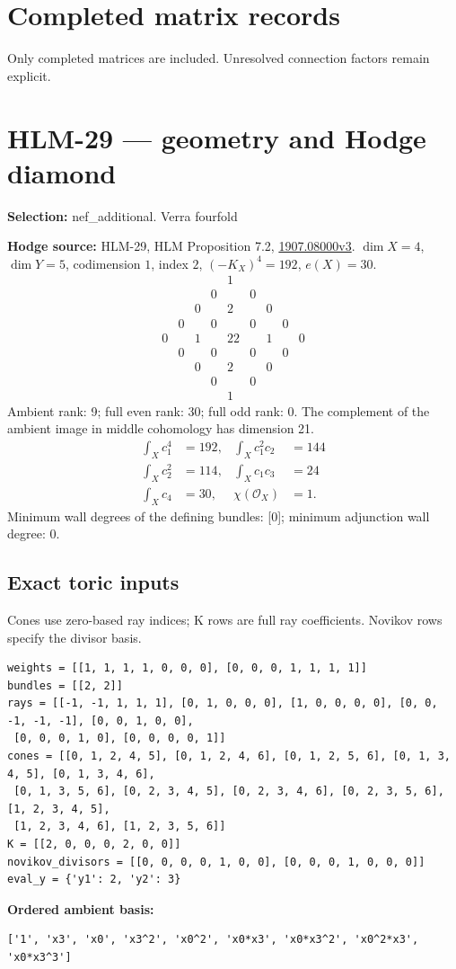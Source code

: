 \documentclass[10pt,a4paper]{article}
\newcommand{\hodge}[4]{\begin{array}{ccccccccc}
&&&&1&&&&\\&&&0&&0&&&\\&&0&&#1&&0&&\\&0&&#2&&#2&&0&\\
0&&#3&&#4&&#3&&0\\&0&&#2&&#2&&0&\\&&0&&#1&&0&&\\&&&0&&0&&&\\&&&&1&&&&\end{array}}
\begin{document}
\section*{Completed matrix records}
Only completed matrices are included. Unresolved connection factors remain explicit.
\clearpage\section*{HLM-29 --- geometry and Hodge diamond}\label{entry:HLM-29}
\textbf{Selection:} nef\_additional.
{\large\color{accent}Verra fourfold}\par
\textbf{Hodge source:} HLM-29, HLM Proposition 7.2, \href{https://arxiv.org/abs/1907.08000v3}{1907.08000v3}.
$\dim X=4$, $\dim Y=5$, codimension $1$, index $2$, $(-K_X)^4=192$, $e(X)=30$.
\[\hodge{2}{0}{1}{22}\]
Ambient rank: 9; full even rank: 30; full odd rank: 0. The complement of the ambient image in middle cohomology has dimension 21.
\[\begin{aligned}\int_Xc_1^4&=192,&\int_Xc_1^2c_2&=144\\\int_Xc_2^2&=114,&\int_Xc_1c_3&=24\\\int_Xc_4&=30,&\chi(\mathcal O_X)&=1.\end{aligned}\]
Minimum wall degrees of the defining bundles: [0]; minimum adjunction wall degree: 0.
\subsection*{Exact toric inputs}
Cones use zero-based ray indices; K rows are full ray coefficients. Novikov rows specify the divisor basis.

\begin{lstlisting}
weights = [[1, 1, 1, 1, 0, 0, 0], [0, 0, 0, 1, 1, 1, 1]]
bundles = [[2, 2]]
rays = [[-1, -1, 1, 1, 1], [0, 1, 0, 0, 0], [1, 0, 0, 0, 0], [0, 0, -1, -1, -1], [0, 0, 1, 0, 0],
 [0, 0, 0, 1, 0], [0, 0, 0, 0, 1]]
cones = [[0, 1, 2, 4, 5], [0, 1, 2, 4, 6], [0, 1, 2, 5, 6], [0, 1, 3, 4, 5], [0, 1, 3, 4, 6],
 [0, 1, 3, 5, 6], [0, 2, 3, 4, 5], [0, 2, 3, 4, 6], [0, 2, 3, 5, 6], [1, 2, 3, 4, 5],
 [1, 2, 3, 4, 6], [1, 2, 3, 5, 6]]
K = [[2, 0, 0, 0, 2, 0, 0]]
novikov_divisors = [[0, 0, 0, 0, 1, 0, 0], [0, 0, 0, 1, 0, 0, 0]]
eval_y = {'y1': 2, 'y2': 3}
\end{lstlisting}

\textbf{Ordered ambient basis:}
\begin{lstlisting}
['1', 'x3', 'x0', 'x3^2', 'x0^2', 'x0*x3', 'x0*x3^2', 'x0^2*x3', 'x0*x3^3']
\end{lstlisting}
\end{document}

